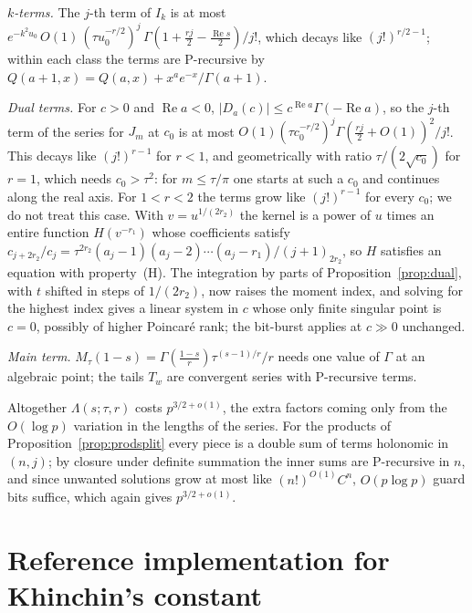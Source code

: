 \documentclass[11pt,reqno]{amsart}
\theoremstyle{definition}
\theoremstyle{remark}
\begin{document}
\begin{small}
\emph{$k$-terms.} The $j$-th term of $I_k$ is at most
$e^{-k^2u_0}\,O(1)\,(\tau u_0^{-r/2})^j\,\Gamma(1+\frac{rj}2-\frac{\operatorname{Re}s}2)/j!$, which decays like
$(j!)^{r/2-1}$; within each class the terms are P-recursive by $Q(a+1,x) = Q(a,x) + x^ae^{-x}/\Gamma(a+1)$.

\emph{Dual terms.} For $c > 0$ and $\operatorname{Re}a < 0$, $|D_a(c)| \le c^{\operatorname{Re}a}\Gamma(-\operatorname{Re}a)$,
so the $j$-th term of the series for $J_m$ at $c_0$ is at most $O(1)(\tau c_0^{-r/2})^j\Gamma(\frac{rj}2+O(1))^2/j!$.
This decays like $(j!)^{r-1}$ for $r < 1$, and geometrically with ratio $\tau/(2\sqrt{c_0})$ for $r = 1$, which needs
$c_0 > \tau^2$: for $m \le \tau/\pi$ one starts at such a $c_0$ and continues along the real axis. For $1 < r < 2$ the
terms grow like $(j!)^{r-1}$ for every $c_0$; we do not treat this case. With $v = u^{1/(2r_2)}$ the kernel is a power
of $u$ times an entire function $H(v^{-r_1})$ whose coefficients satisfy
$c_{j+2r_2}/c_j = \tau^{2r_2}(a_j-1)(a_j-2)\cdots(a_j-r_1)/(j+1)_{2r_2}$, so $H$ satisfies an equation with
property~(H). The integration by parts of Proposition~\ref{prop:dual}, with $t$ shifted in steps of $1/(2r_2)$, now
raises the moment index, and solving for the highest index gives a linear system in $c$ whose only finite singular
point is $c = 0$, possibly of higher Poincar\'e rank; the bit-burst applies at $c \gg 0$ unchanged.

\emph{Main term.} $M_\tau(1-s) = \Gamma(\frac{1-s}r)\tau^{(s-1)/r}/r$ needs one value of $\Gamma$ at an algebraic point;
the tails $T_w$ are convergent series with P-recursive terms.

Altogether $\Lambda(s;\tau,r)$ costs $p^{3/2+o(1)}$, the extra factors coming only from the $O(\log p)$ variation in the
lengths of the series. For the products of Proposition~\ref{prop:prodsplit} every piece is a double sum of terms
holonomic in $(n, j)$; by closure under definite summation \cite{Zei90} the inner sums are P-recursive in $n$, and
since unwanted solutions grow at most like $(n!)^{O(1)}C^n$, $O(p\log p)$ guard bits suffice, which again gives
$p^{3/2+o(1)}$.

\end{small}

\section{Reference implementation for Khinchin's constant}\label{sec:khpseudo}
\end{document}
